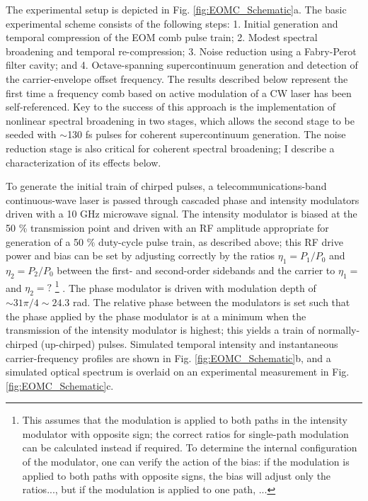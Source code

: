 The experimental setup is depicted in Fig. \ref{fig:EOMC_Schematic}a. The basic experimental scheme consists of the following steps: 1. Initial generation and temporal compression of the EOM comb pulse train; 2. Modest spectral broadening and temporal re-compression; 3. Noise reduction using a Fabry-Perot filter cavity; and 4. Octave-spanning supercontinuum generation and detection of the carrier-envelope offset frequency. The results described below represent the first time a frequency comb based on active modulation of a CW laser has been self-referenced. Key to the success of this approach is the implementation of nonlinear spectral broadening in two stages, which allows the second stage to be seeded with $\sim$130 fs pulses for coherent supercontinuum generation. The noise reduction stage is also critical for coherent spectral broadening; I describe a characterization of its effects below.

To generate the initial train of chirped pulses, a telecommunications-band continuous-wave laser is passed through cascaded phase and intensity modulators driven with a 10 GHz microwave signal. The intensity modulator is biased at the 50 \% transmission point and driven with an RF amplitude appropriate for generation of a 50 $\%$ duty-cycle pulse train, as described above; this RF drive power and bias can be set by adjusting correctly by the ratios $\eta_1=P_1/P_0$ and $\eta_2=P_2/P_0$ between the first- and second-order sidebands and the carrier to $\eta_1=$ and $\eta_2=?$ \footnote{This assumes that the modulation is applied to both paths in the intensity modulator with opposite sign; the correct ratios for single-path modulation can be calculated instead if required. To determine the internal configuration of the modulator, one can verify the action of the bias: if the modulation is applied to both paths with opposite signs, the bias will adjust only the ratios..., but if the modulation is applied to one path, ...} . The phase modulator is driven with modulation depth of $\sim31\pi/4\sim24.3$ rad. The relative phase between the modulators is set such that the phase applied by the phase modulator is at a minimum when the transmission of the intensity modulator is highest; this yields a train of normally-chirped (up-chirped) pulses. Simulated temporal intensity and instantaneous carrier-frequency profiles are shown in Fig. \ref{fig:EOMC_Schematic}b, and a simulated optical spectrum is overlaid on an experimental measurement in Fig. \ref{fig:EOMC_Schematic}c.


